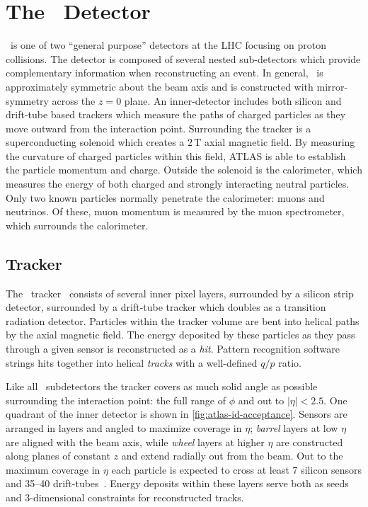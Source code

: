 \section{The \atlas\ Detector}
\label{sec:atlas}

\atlas\ is one of two ``general purpose'' detectors at the LHC focusing on proton collisions.
The detector is composed of several nested sub-detectors which provide complementary information when reconstructing an event.
In general, \atlas\ is approximately symmetric about the beam axis and is constructed with mirror-symmetry across the $z = 0$ plane.
An inner-detector includes both silicon and drift-tube based trackers which measure the paths of charged particles as they move outward from the interaction point.
Surrounding the tracker is a superconducting solenoid which creates a $2\,\text{T}$ axial magnetic field.
By measuring the curvature of charged particles within this field, ATLAS is able to establish the particle momentum and charge.
Outside the solenoid is the calorimeter, which measures the energy of both charged and strongly interacting neutral particles.
Only two known particles normally penetrate the calorimeter: muons and neutrinos.
Of these, muon momentum is measured by the muon spectrometer, which surrounds the calorimeter.

\subsection{Tracker}

The \atlas\ tracker~\cite{atlas-id1,atlas-id2} consists of several inner pixel layers, surrounded by a silicon strip detector, surrounded by a drift-tube tracker which doubles as a transition radiation detector.
Particles within the tracker volume are bent into helical paths by the axial magnetic field. The energy deposited by these particles as they pass through a given sensor is reconstructed as a \emph{hit}. Pattern recognition software strings hits together into helical \emph{tracks} with a well-defined $q/p$ ratio. %

Like all \atlas\ subdetectors the tracker covers as much solid angle as possible surrounding the interaction point: the full range of $\phi$ and out to $|\eta| < 2.5$.
One quadrant of the inner detector is shown in \cref{fig:atlas-id-acceptance}.
Sensors are arranged in layers and angled to maximize coverage in $\eta$; \emph{barrel} layers at low $\eta$ are aligned with the beam axis, while \emph{wheel} layers at higher $\eta$ are constructed along planes of constant $z$ and extend radially out from the beam.
Out to the maximum coverage in $\eta$ each particle is expected to cross at least 7 silicon sensors and 35--40 drift-tubes~\cite{DetPap,atlas-trt2}.
Energy deposits within these layers serve both as seeds and 3-dimensional constraints for reconstructed tracks.

